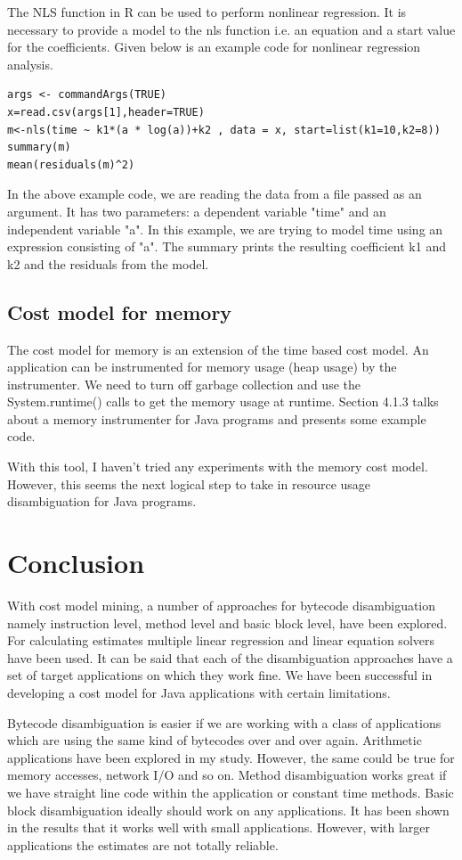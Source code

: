 \documentclass[11pt]{article}
\begin{document}
The NLS function in R can be used to perform nonlinear regression. It is necessary to provide a model to the nls function i.e. an equation and a start value for the coefficients. Given below is an example code for nonlinear regression analysis.

\begin{lstlisting}
args <- commandArgs(TRUE)
x=read.csv(args[1],header=TRUE)
m<-nls(time ~ k1*(a * log(a))+k2 , data = x, start=list(k1=10,k2=8))
summary(m)
mean(residuals(m)^2)
\end{lstlisting}

In the above example code, we are reading the data from a file passed as an argument. It has two parameters: a dependent variable "time" and an independent variable "a". In this example, we are trying to model time using an expression consisting of "a". The summary prints the resulting coefficient k1 and k2 and the residuals from the model. 

\subsection{Cost model for memory}
The cost model for memory is an extension of the time based cost model. An application can be instrumented for memory usage (heap usage) by the instrumenter. We need to turn off garbage collection and use the System.runtime() calls to get the memory usage at runtime. Section 4.1.3 talks about a memory instrumenter for Java programs and presents some example code.

With this tool, I haven't tried any experiments with the memory cost model. However, this seems the next logical step to take in resource usage disambiguation for Java programs.

\newpage

\section{Conclusion}
With cost model mining, a number of approaches for bytecode disambiguation namely instruction level, method level and basic block level, have been explored. For calculating estimates multiple linear regression and linear equation solvers have been used. It can be said that each of the disambiguation approaches have a set of target applications on which they work fine. We have been successful in developing a cost model for Java applications with certain limitations.

Bytecode disambiguation is easier if we are working with a class of applications which are using the same kind of bytecodes over and over again. Arithmetic applications have been explored in my study. However, the same could be true for memory accesses, network I/O and so on. Method disambiguation works great if we have straight line code within the application or constant time methods. Basic block disambiguation ideally should work on any applications. It has been shown in the results that it works well with small applications. However, with larger applications the estimates are not totally reliable.
\end{document}
